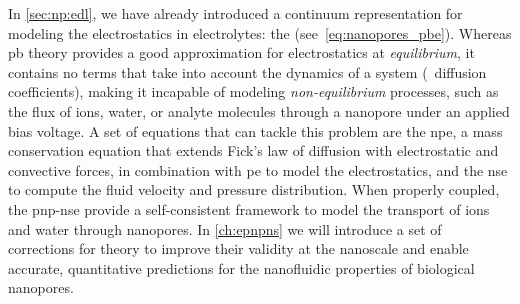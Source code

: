 In \cref{sec:np:edl}, we have already introduced a continuum representation for modeling the electrostatics in
electrolytes: the  (see~\cref{eq:nanopores_pbe}). Whereas \gls{pb} theory provides a good
approximation for electrostatics at \emph{equilibrium}, it contains no terms that take into account the
dynamics of a system (\eg~diffusion coefficients), making it incapable of modeling \emph{non-equilibrium}
processes, such as the flux of ions, water, or analyte molecules through a nanopore under an applied bias
voltage. A set of equations that can tackle this problem are the \gls{npe}, a mass conservation equation that
extends Fick's law of diffusion with electrostatic and convective forces, in combination with \gls{pe} to
model the electrostatics, and the \gls{nse} to compute the fluid velocity and pressure distribution. When
properly coupled, the \gls{pnp-nse} provide a self-consistent framework to model the transport of ions and
water through nanopores. In \cref{ch:epnpns} we will introduce a set of corrections for
 theory to improve their validity at the nanoscale and enable accurate, quantitative
predictions for the nanofluidic properties of biological nanopores.

